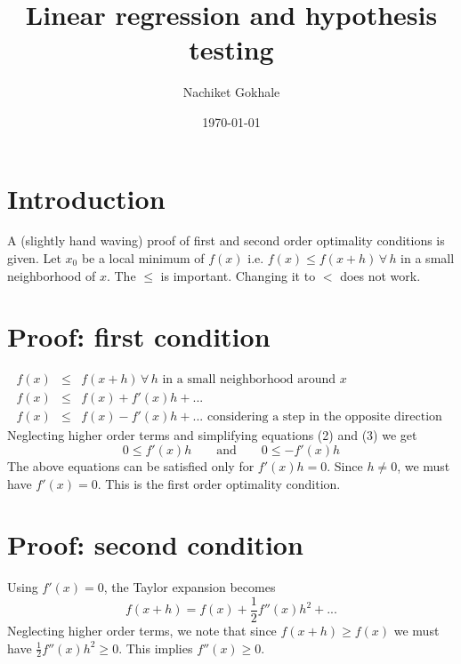 \documentclass{article}
\newcommand{\beq}{\begin{equation}}
\newcommand{\eeq}{\end{equation}}
\newcommand{\ber}{\begin{eqnarray}}
\newcommand{\eer}{\end{eqnarray}}
\begin{document}
\title{Linear regression and hypothesis testing}
\author{Nachiket Gokhale}
\date{\today}
\maketitle
\section{Introduction}
A (slightly hand waving) proof of first and second order optimality conditions is given. Let $x_0$ be a local minimum of $f(x)$ i.e. $f(x) \leq f(x+h) \,\forall\, h $ in a small neighborhood of $x$. The $\leq$ is important. Changing it to $<$ does not work.
\section{Proof: first condition}
\ber
f(x) &\leq& f(x+h)  \,\forall\, h \text{ in a small neighborhood around } x \\
f(x) &\leq& f(x) + f'(x)h + ...\\ 
f(x) &\leq& f(x) - f'(x)h + ... \text{ considering a step in the opposite direction }
\eer
Neglecting higher order terms and simplifying equations (2) and (3) we get
\beq
0 \leq f'(x)h \qquad \text{and} \qquad 0 \leq -f'(x)h
\eeq
The above equations can be satisfied only for $f'(x)h=0$. Since $h\neq{0}$, we must have $f'(x)=0$. This is the first order optimality condition.
\section{Proof: second condition}
Using $f'(x)=0$, the Taylor expansion becomes
\beq
f(x+h) = f(x) + \frac{1}{2}f''(x)h^2 + ...
\eeq
Neglecting higher order terms, we note that since $f(x+h) \geq f(x)$ we must have $\frac{1}{2}f''(x)h^2 \geq 0$. This implies $f''(x) \geq 0$. 
\end{document}

